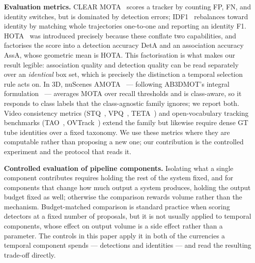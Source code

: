 \noindent\textbf{Evaluation metrics.} CLEAR MOTA~\cite{clearmot} scores a
tracker by counting FP, FN, and identity switches, but is dominated by detection
errors; IDF1~\cite{idf1} rebalances toward identity by matching whole
trajectories one-to-one and reporting an identity F1. HOTA~\cite{hota} was
introduced precisely because these conflate two capabilities, and factorises the
score into a detection accuracy DetA and an association accuracy AssA, whose
geometric mean is HOTA. This factorisation is what makes our result legible:
association quality and detection quality can be read separately over an
\emph{identical} box set, which is precisely the distinction a temporal
selection rule acts on. In 3D, nuScenes AMOTA~\cite{nuscenes_tracking} ---
following AB3DMOT's integral formulation~\cite{ab3dmot} --- averages MOTA over
recall thresholds and is class-aware, so it responds to class labels that the
class-agnostic family ignores; we report both. Video consistency metrics
(STQ~\cite{step}, VPQ~\cite{vpq}, TETA~\cite{teta}) and open-vocabulary tracking
benchmarks (TAO~\cite{tao}, OVTrack~\cite{ovtrack}) extend the family but
likewise require dense GT tube identities over a fixed taxonomy. We use these
metrics where they are computable rather than proposing a new one; our
contribution is the controlled experiment and the protocol that reads it.

\noindent\textbf{Controlled evaluation of pipeline components.} Isolating what a
single component contributes requires holding the rest of the system fixed, and
for components that change how much output a system produces, holding the
output budget fixed as well; otherwise the comparison rewards volume rather than
the mechanism. Budget-matched comparison is standard practice when scoring
detectors at a fixed number of proposals, but it is not usually applied to
temporal components, whose effect on output volume is a side effect rather than
a parameter. The controls in this paper apply it in both of the currencies a
temporal component spends --- detections and identities --- and read the
resulting trade-off directly.
